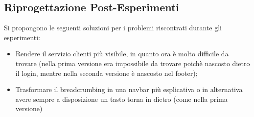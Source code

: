 \subsection{Riprogettazione Post-Esperimenti}
Si propongono le seguenti soluzioni per i problemi riscontrati durante gli esperimenti:
\begin{itemize}
	\item Rendere il servizio clienti più visibile, in quanto ora è molto difficile da trovare (nella prima versione era impossibile da trovare poichè nascosto dietro il login, mentre nella seconda versione è nascosto nel footer);
	\item Trasformare il breadcrumbing in una navbar più esplicativa o in alternativa avere sempre a disposizione un tasto torna in dietro (come nella prima versione)
\end{itemize}